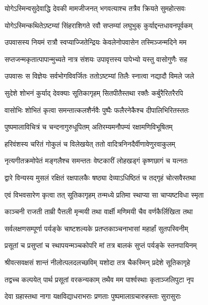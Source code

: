 \twolineshloka
{योगेऽस्मिन्वसुदेवाद्धि देवकी मामजीजनत्}
{भगवत्याश्च तत्रैव क्रियते सुमहोत्सवः}%

\twolineshloka
{योगेऽस्मिन्कथितेऽष्टम्यां सिंहराशिगते रवौ}
{सप्तम्यां लघुभुक् कुर्याद्दन्तधावनपूर्वकम्}%

\twolineshloka
{उपवासस्य नियमं रात्रौ स्वप्याज्जितेन्द्रियः}
{केवलेनोपवासेन तस्मिञ्जन्मदिने मम}%

\twolineshloka
{सप्तजन्मकृतात्पापान्मुच्यते नात्र संशयः}
{उपावृत्तस्य पापेभ्यो यस्तु वासोगुणैः सह}%

\twolineshloka
{उपवासः स विज्ञेयः सर्वभोगविवर्जितः}
{ततोऽष्टम्यां तिलैः स्नात्वा नद्यादौ विमले जले}%

\twolineshloka
{सुदेशे शोभनं कुर्याद् देवक्याः सूतिकागृहम्}
{सितपीतैस्तथा रक्तैः कर्बुरैरितरैरपि}%

\twolineshloka
{वासोभिः शोभितं कृत्वा समन्तात्कलशैर्नवैः}
{पुष्पैः फलैरनेकैश्च दीपालिभिरितस्ततः}%

\twolineshloka
{पुष्पमालाविचित्रं च चन्दनागुरुधूपितम्}
{अतिरम्यमनौपम्यं रक्षामणिविभूषितम्}%

\twolineshloka
{हरिवंशस्य चरितं गोकुलं च विलेखयेत्}
{ततो वादित्रनिनदैर्वीणावेणुरवाकुलम्}%

\twolineshloka
{नृत्यगीतक्रमोपेतं मङ्गलैश्च समन्ततः}
{वेष्टकारीं लोहखड्गं कृष्णछागं च यत्नतः}%

\twolineshloka
{द्वारे विन्यस्य मुसलं रक्षितं रक्षपालकैः}
{षष्ठ्या देव्याऽधिष्ठितं च तद्गृहं चोत्सवैस्तथा}%

\twolineshloka
{एवं विभवसारेण कृत्वा तत् सूतिकागृहम्}
{तन्मध्ये प्रतिमा स्थाप्या सा चाप्यष्टविधा स्मृता}%

\twolineshloka
{काञ्चनी राजती ताम्री पैत्तली मृन्मयी तथा}
{वार्क्षी मणिमयी चैव वर्णकैर्लिखिता तथा}%

\twolineshloka
{सर्वलक्षणसम्पूर्णा पर्यङ्के चाष्टशल्यके}
{प्रतप्तकाञ्चनाभासां महार्हां सुतपस्विनीम्}%

\twolineshloka
{प्रसूतां च प्रसुप्तां च स्थापयन्मञ्चकोपरि}
{मां तत्र बालकं सुप्तं पर्यङ्के स्तनपायिनम्}%

\twolineshloka
{श्रीवत्सवक्षसं शान्तं नीलोत्पलदलच्छविम्}
{यशोदा तत्र चैकस्मिन् प्रदेशे सूतिकागृहे}%

\twolineshloka
{तद्वच्च कल्पयेत् पार्थ प्रसूतां वरकन्यकाम्}
{तथैव मम पार्श्वस्थाः कृताञ्जलिपुटा नृप}%

\twolineshloka
{देवा ग्रहास्तथा नागा यक्षविद्याधराभराः}
{प्रणताः पुष्पमालाग्रचारुहस्ताः सुरासुराः}%

